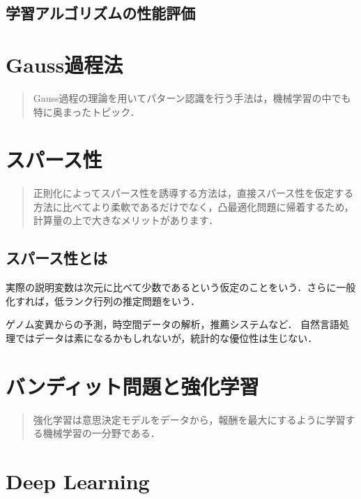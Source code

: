 \documentclass[uplatex,dvipdfmx]{jsreport}
\begin{document}
\section{学習アルゴリズムの性能評価}

\chapter{Gauss過程法}

\begin{quotation}
    Gauss過程の理論を用いてパターン認識を行う手法は，機械学習の中でも特に奥まったトピック．
\end{quotation}

\chapter{スパース性}

\begin{quotation}
    正則化によってスパース性を誘導する方法は，直接スパース性を仮定する方法に比べてより柔軟であるだけでなく，凸最適化問題に帰着するため，計算量の上で大きなメリットがあります．
\end{quotation}

\section{スパース性とは}

\begin{definition}
    実際の説明変数は次元に比べて少数であるという仮定のことをいう．さらに一般化すれば，低ランク行列の推定問題をいう．
\end{definition}
\begin{example}
    ゲノム変異からの予測，時空間データの解析，推薦システムなど．
    自然言語処理ではデータは素になるかもしれないが，統計的な優位性は生じない．
\end{example}

\chapter{バンディット問題と強化学習}

\begin{quotation}
    強化学習は意思決定モデルをデータから，報酬を最大にするように学習する機械学習の一分野である．
    
\end{quotation}

\chapter{Deep Learning}
\end{document}
